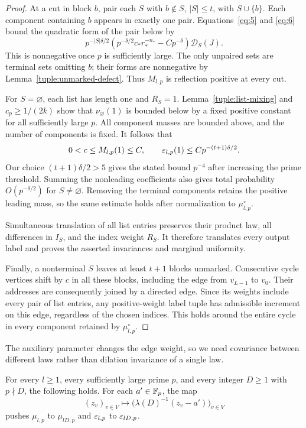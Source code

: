 \begin{proof}
At a cut in block $b$, pair each $S$ with $b\notin S$, $|S|\le t$,
with $S\cup\{b\}$.  Each component containing $b$ appears in exactly
one pair.  Equations~\eqref{eq:5} and \eqref{eq:6} bound the quadratic
form of the pair below by
\[
 p^{-|S|\delta/2}
 \left(p^{-\delta/2}c_*r_*^{-n_*}-Cp^{-\delta}\right)
 \mathcal D_S(J).
\]
This is nonnegative once $p$ is sufficiently large.  The only unpaired
sets are terminal sets omitting $b$; their forms are nonnegative by
Lemma~\ref{tuple:unmarked-defect}.  Thus $M_{l,p}$ is reflection
positive at every cut.

For $S=\varnothing$, each list has length one and $R_S=1$.
Lemma~\ref{tuple:list-mixing} and $c_p\ge1/(2k)$ show that
$\nu_{\varnothing}(1)$ is bounded below by a fixed positive constant
for all sufficiently large $p$.  All component masses are bounded
above, and the number of components is fixed.  It follows that
\[
 0<c\le M_{l,p}(1)\le C,\qquad
 \varepsilon_{l,p}(1)\le C p^{-(t+1)\delta/2}.
\]
Our choice $(t+1)\delta/2>5$ gives the stated bound $p^{-4}$ after
increasing the prime threshold.  Summing the nonleading coefficients
also gives total probability $O(p^{-\delta/2})$ for $S\ne\varnothing$.
Removing the terminal components retains the positive leading mass,
so the same estimate holds after normalization to $\mu_{l,p}^{\circ}$.

Simultaneous translation of all list entries preserves their product
law, all differences in $I_S$, and the index weight $R_S$.  It
therefore translates every output label and proves the asserted
invariances and marginal uniformity.

Finally, a nonterminal $S$ leaves at least $t+1$ blocks unmarked.
Consecutive cycle vertices shift by $c$ in all these blocks, including
the edge from $v_{L-1}$ to $v_0$.  Their addresses are consequently
joined by a directed edge.  Since its weights include every pair of
list entries, any positive-weight label tuple has admissible
increment on this edge, regardless of the chosen indices.  This
holds around the entire cycle in every component retained by
$\mu_{l,p}^{\circ}$.
\end{proof}

The auxiliary parameter changes the edge weight, so we need covariance
between different laws rather than dilation invariance of a single law.

\begin{lemma}
\label{tuple:covariance}
For every $l\ge1$, every sufficiently large prime $p$, and every
integer $D\ge1$ with $p\nmid D$, the following holds.  For each
$a'\in\mathbb F_p$, the map
\begin{equation}
 (z_v)_{v\in V}\longmapsto
       \bigl(\lambda(D)^{-1}(z_v-a')\bigr)_{v\in V}
 \label{eq:7}
\end{equation}
pushes $\mu_{l,p}$ to $\mu_{lD,p}$ and $\varepsilon_{l,p}$ to
$\varepsilon_{lD,p}$.
\end{lemma}

